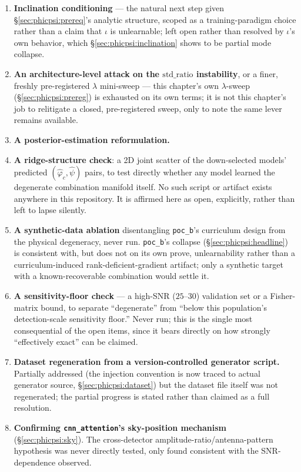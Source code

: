 \begin{enumerate}
\item[(i)] \textbf{Inclination conditioning} --- the natural next step given \S\ref{sec:phicpsi:prereq}'s analytic structure, scoped as a training-paradigm choice rather than a claim that $\iota$ is unlearnable; left open rather than resolved by $\iota$'s own behavior, which \S\ref{sec:phicpsi:inclination} shows to be partial mode collapse.
\item[(ii)] \textbf{An architecture-level attack on the $\text{std\_ratio}$ instability}, or a finer, freshly pre-registered $\lambda$ mini-sweep --- this chapter's own $\lambda$-sweep (\S\ref{sec:phicpsi:prereg}) is exhausted on its own terms; it is not this chapter's job to relitigate a closed, pre-registered sweep, only to note the same lever remains available.
\item[(iii)] \textbf{A posterior-estimation reformulation.}
\item[(iv)] \textbf{A ridge-structure check}: a 2D joint scatter of the down-selected models' predicted $(\hat\varphi_c, \hat\psi)$ pairs, to test directly whether any model learned the degenerate combination manifold itself.
No such script or artifact exists anywhere in this repository.
It is affirmed here as open, explicitly, rather than left to lapse silently.
\item[(v)] \textbf{A synthetic-data ablation} disentangling \texttt{poc\_b}'s curriculum design from the physical degeneracy, never run.
\texttt{poc\_b}'s collapse (\S\ref{sec:phicpsi:headline}) is consistent with, but does not on its own prove, unlearnability rather than a curriculum-induced rank-deficient-gradient artifact; only a synthetic target with a known-recoverable combination would settle it.
\item[(vi)] \textbf{A sensitivity-floor check} --- a high-SNR ($25$--$30$) validation set or a Fisher-matrix bound, to separate ``degenerate'' from ``below this population's detection-scale sensitivity floor.''
Never run; this is the single most consequential of the open items, since it bears directly on how strongly ``effectively exact'' can be claimed.
\item[(vii)] \textbf{Dataset regeneration from a version-controlled generator script.}
Partially addressed (the injection convention is now traced to actual generator source, \S\ref{sec:phicpsi:dataset}) but the dataset file itself was not regenerated; the partial progress is stated rather than claimed as a full resolution.
\item[(viii)] \textbf{Confirming \texttt{cnn\_attention}'s sky-position mechanism} (\S\ref{sec:phicpsi:sky}).
The cross-detector amplitude-ratio/antenna-pattern hypothesis was never directly tested, only found consistent with the SNR-dependence observed.
\end{enumerate}


